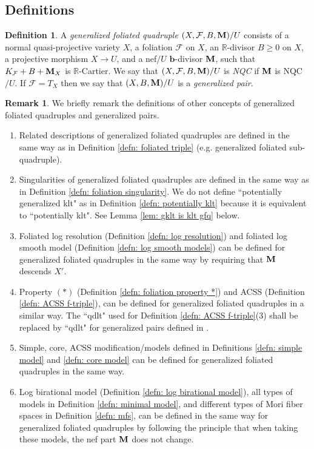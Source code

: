 \documentclass[11pt]{amsart}
\numberwithin{equation}{section}
\newcommand{\bb}{\bm{b}}
\newcommand{\Mm}{{\bf{M}}}
\newcommand{\Rr}{\mathbb{R}}
\newcommand{\Ff}{\mathcal{F}}
\theoremstyle{definition}
\newtheorem{defn}[thm]{Definition}
\theoremstyle{definition}
\newtheorem{rem}[thm]{Remark}
\theoremstyle{definition}
\begin{document}
\subsection{Definitions}
\begin{defn}
A \emph{generalized foliated quadruple} $(X,\Ff,B,\Mm)/U$ consists of a normal quasi-projective variety $X$, a foliation $\Ff$ on $X$, an $\Rr$-divisor $B\geq 0$ on $X$, a projective morphism $X\rightarrow U$, and a nef$/U$ $\bb$-divisor $\Mm$, such that $K_{\Ff}+B+\Mm_X$ is $\mathbb R$-Cartier. We say that $(X,\Ff,B,\Mm)/U$ is \emph{NQC} if $\Mm$ is NQC$/U$. If $\Ff=T_X$ then we say that $(X,B,\Mm)/U$ is a \emph{generalized pair}. 
\end{defn}

\begin{rem} We briefly remark the definitions of other concepts of  generalized foliated quadruples and generalized pairs.
\begin{enumerate}
\item   Related descriptions of generalized foliated quadruples are defined in the same way as in Definition \ref{defn: foliated triple} (e.g. generalized foliated sub-quadruple).
\item     Singularities of generalized foliated quadruples are defined in the same way as in Definition \ref{defn: foliation singularity}. We do not define ``potentially generalized klt" as in Definition \ref{defn: potentially klt} because it is equivalent to ``potentially klt". See Lemma \ref{lem: gklt is klt gfq} below.
\item Foliated log resolution (Definition \ref{defn: log resolution}) and foliated log smooth model (Definition \ref{defn: log smooth models}) can be defined for  generalized foliated quadruples in the same way by requiring that $\Mm$ descends $X'$.
\item Property $(*)$ (Definition \ref{defn: foliation property *}) and ACSS (Definition \ref{defn: ACSS f-triple}), can be defined for generalized foliated quadruples in a similar way. The ``qdlt" used for Definition \ref{defn: ACSS f-triple}(3) shall be replaced by ``qdlt" for generalized pairs defined in \cite[Definition 7.1.1]{CHLX23}.
\item Simple, core, ACSS modification/models defined in Definitions \ref{defn: simple model} and \ref{defn: core model} can be defined for generalized foliated quadruples in the same way.
\item Log birational model (Definition \ref{defn: log birational model}), all types of models in Definition \ref{defn: minimal model}, and different types of Mori fiber spaces in Definition \ref{defn: mfs}, can be defined in the same way for generalized foliated quadruples by following the principle that when taking these models, the nef part $\Mm$ does not change.
\end{enumerate}
\end{rem}
\end{document}
